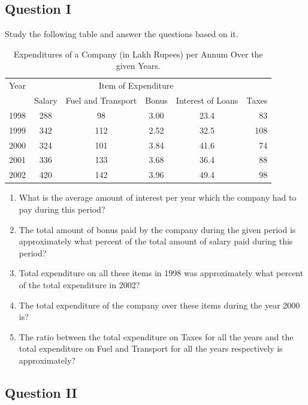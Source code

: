 \documentclass[a4paper]{article}
\begin{document}
\subsection*{Question I}
Study the following table and answer the questions based on it. \cite{float}

\begin{table}[h] 
\begin{tabular}{|l|c|c|c|c|r|}
\hline
Year & \multicolumn{4}{c}{Item of Expenditure} \\
& Salary & Fuel and Transport & Bonus & Interest of Loans & Taxes\\
 \hline
 1998 & 288 & 98 & 3.00 & 23.4 & 83 \\ 
  \hline
 1999 & 342 & 112 & 2.52 & 32.5 & 108 \\ 
  \hline
 2000 & 324 & 101 & 3.84 & 41.6 & 74 \\ 
 \hline
 2001 & 336 & 133 & 3.68 & 36.4 & 88 \\ 
 \hline
 2002 & 420 & 142 & 3.96 & 49.4 & 98 \\ 
 \hline
\end{tabular}
\caption{\label{Question I} Expenditures of a Company (in Lakh Rupees) per Annum Over the given Years.}
\end{table}


\begin{enumerate}
\item What is the average amount of interest per year which the company had to pay during this period?
\item The total amount of bonus paid by the company during the given period is approximately what percent of the total amount of salary paid during this period?
\item Total expenditure on all these items in 1998 was approximately what percent of the total expenditure in 2002?
\item The total expenditure of the company over these items during the year 2000 is?
\item The ratio between the total expenditure on Taxes for all the years and the total expenditure on Fuel and Transport for all the years respectively is approximately?
\end{enumerate}

\subsection*{Question II}
\end{document}
